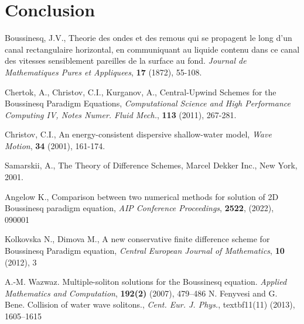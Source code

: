\documentclass[%
 aip,
cp,  
 amsmath,amssymb,
 reprint,
]{iopconfser}
\begin{document}
\fi
\section{Conclusion}

\begin{thebibliography}{99} \normalsize

 Boussinesq, J.V., Theorie des ondes et des remous qui se propagent le long d'un canal rectangulaire horizontal, en communiquant au liquide contenu dans ce canal des vitesses sensiblement pareilles de la surface au fond.  {\it Journal de Mathematiques Pures et Appliquees}, \textbf{17} (1872), 55-108.

 Chertok, A., Christov, C.I., Kurganov, A., Central-Upwind Schemes for the Boussinesq Paradigm Equations,
{\it Computational Science and High Performance Computing IV, Notes Numer. Fluid Mech.}, \textbf{113} (2011), 267-281.

 Christov, C.I., An energy-consistent dispersive shallow-water model,  {\it Wave Motion}, \textbf{34} (2001), 161-174.

 Samarskii, A., The Theory of Difference Schemes, Marcel Dekker Inc., New York, 2001.

 Angelow K., Comparison between two numerical methods for solution of 2D Boussinesq paradigm equation, \emph{AIP Conference Proceedings}, \textbf{2522}, (2022), 090001

 Kolkovska N., Dimova M., A new conservative finite difference scheme for Boussinesq Paradigm equation, \emph{ Central European Journal of Mathematics}, \textbf{10} (2012), 3

 A.-M. Wazwaz. Multiple-soliton solutions for the Boussinesq equation. \emph{Applied Mathematics and Computation}, \textbf{192(2)} (2007), 479–486
 N. Fenyvesi and G. Bene. Collision of water wave solitons., \emph{Cent. Eur. J. Phys.}, textbf{11(11)} (2013), 1605–1615

\end{thebibliography}
\end{document}
